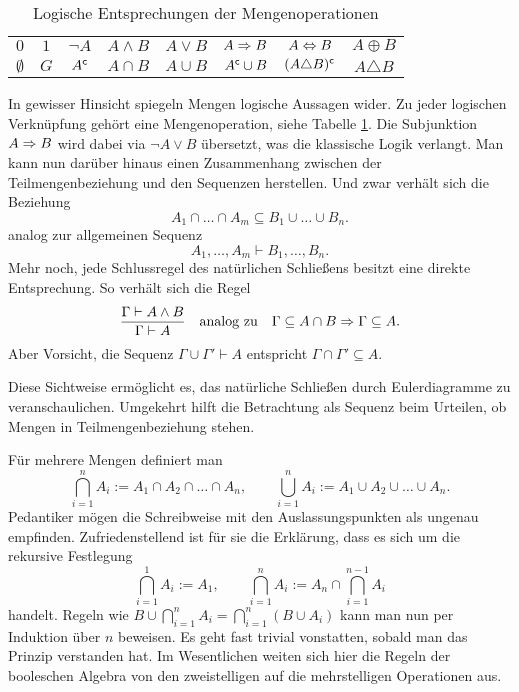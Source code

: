 \begin{table}
\begin{center}
\caption{Logische Entsprechungen der Mengenoperationen}
\label{tab:op-Logik-Mengen}
\begin{tabular}{c@{\quad\;\;}c@{\quad\;\;}c@{\quad\;\;}c@{\quad\;\;}%
c@{\quad\;\;}c@{\quad\;\;}c@{\quad\;\;}c}
\toprule
$0$ & $1$ & $\lnot A$ & $A\land B$ & $A\lor B$
& $A\Rightarrow B$ & $A\Leftrightarrow B$ & $A\oplus B$\\
$\emptyset$ & $G$ & $A^\mathsf c$ & $A\cap B$ & $A\cup B$
& $A^\mathsf c\cup B$ & $(A\triangle B)^\mathsf c$ & $A\triangle B$\\
\bottomrule
\end{tabular}
\end{center}
\end{table}

In gewisser Hinsicht spiegeln Mengen logische Aussagen wider.
Zu jeder logischen Verknüpfung gehört eine Mengenoperation, siehe
Tabelle \ref{tab:op-Logik-Mengen}. Die Subjunktion $A\Rightarrow B$
wird dabei via $\lnot A\lor B$ übersetzt, was die klassische Logik
verlangt. Man kann nun darüber hinaus einen
Zusammenhang zwischen der Teilmengenbeziehung und den Sequenzen
herstellen. Und zwar verhält sich die Beziehung
\[A_1\cap\ldots\cap A_m\subseteq B_1\cup\ldots\cup B_n.\]
analog zur allgemeinen Sequenz
\[A_1,\ldots,A_m\vdash B_1,\ldots,B_n.\]
Mehr noch, jede Schlussregel des natürlichen Schließens besitzt eine
direkte Entsprechung. So verhält sich die Regel
\[\frac{\Gamma\vdash A\land B}{\Gamma\vdash A}
\quad\text{analog zu}\quad\Gamma\subseteq A\cap B\Rightarrow\Gamma\subseteq A.\]
Aber Vorsicht, die Sequenz $\Gamma\cup\Gamma'\vdash A$ entspricht
$\Gamma\cap\Gamma'\subseteq A$.

Diese Sichtweise ermöglicht es, das natürliche Schließen durch
Eulerdiagramme zu veranschaulichen. Umgekehrt hilft die Betrachtung
als Sequenz beim Urteilen, ob Mengen in Teilmengenbeziehung stehen.

Für mehrere Mengen definiert man
\[\bigcap_{i=1}^n A_i := A_1\cap A_2\cap\ldots\cap A_n,\qquad
\bigcup_{i=1}^n A_i := A_1\cup A_2\cup\ldots\cup A_n.\]
Pedantiker mögen die Schreibweise mit den Auslassungspunkten als
ungenau empfinden. Zufriedenstellend ist für sie die Erklärung, dass
es sich um die rekursive Festlegung%
\[\bigcap_{i=1}^1 A_i := A_1,\qquad
\bigcap_{i=1}^n A_i := A_n\cap\bigcap_{i=1}^{n-1} A_i\]
handelt. Regeln wie $B\cup\bigcap_{i=1}^n A_i
= \bigcap_{i=1}^n (B\cup A_i)$ kann man nun per Induktion über $n$
beweisen. Es geht fast trivial vonstatten, sobald man das Prinzip
verstanden hat. Im Wesentlichen weiten sich hier die Regeln der
booleschen Algebra von den zweistelligen auf die mehrstelligen
Operationen aus.

